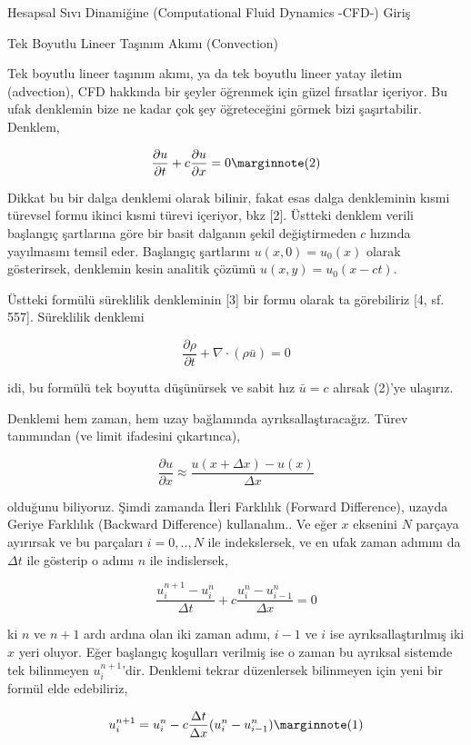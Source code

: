 \documentclass[12pt,fleqn]{article}\usepackage{../../common}
\begin{document}
Hesapsal Sıvı Dinamiğine (Computational Fluid Dynamics -CFD-) Giriş 

Tek Boyutlu Lineer Taşınım Akımı (Convection)

Tek boyutlu lineer taşınım akımı, ya da tek boyutlu lineer yatay iletim
(advection), CFD hakkında bir şeyler öğrenmek için güzel fırsatlar içeriyor. Bu
ufak denklemin bize ne kadar çok şey öğreteceğini görmek bizi
şaşırtabilir. Denklem,

$$
\frac{\partial u}{\partial t} +
c \frac{\partial u}{\partial x}  = 0
\mlabel{2}
$$

Dikkat bu bir dalga denklemi olarak bilinir, fakat esas dalga denkleminin kısmi
türevsel formu ikinci kısmi türevi içeriyor, bkz [2]. Üstteki denklem verili
başlangıç şartlarına göre bir basit dalganın şekil değiştirmeden $c$ hızında
yayılmasını temsil eder. Başlangıç şartlarını $u(x,0) = u_0(x)$ olarak
gösterirsek, denklemin kesin analitik çözümü $u(x,y) = u_0(x-ct)$.

Üstteki formülü süreklilik denkleminin [3] bir formu olarak ta görebiliriz [4, sf. 557].
Süreklilik denklemi

$$
\frac{\partial \rho}{\partial t}  + \nabla \cdot (\rho \bar{u} ) = 0
$$

idi, bu formülü tek boyutta düşünürsek ve sabit hız $\bar{u} = c$ alırsak (2)'ye ulaşırız.


Denklemi hem zaman, hem uzay bağlamında ayrıksallaştıracağız. Türev tanımından
(ve limit ifadesini çıkartınca),

$$
\frac{\partial u}{\partial x} \approx
\frac{u(x+\Delta x) - u(x)}{\Delta x}
$$

olduğunu biliyoruz. Şimdi zamanda İleri Farklılık (Forward Difference), uzayda
Geriye Farklılık (Backward Difference) kullanalım.. Ve eğer $x$ eksenini $N$
parçaya ayırırsak ve bu parçaları $i=0,..,N$ ile indekslersek, ve en ufak zaman
adımını da $\Delta t$ ile gösterip o adımı $n$ ile indislersek,

$$
\frac{u_i^{n+1} - u_i^n}{\Delta t} + c \frac{u_i^{n} - u_{i-1}^n}{\Delta x} = 0
$$

ki $n$ ve $n+1$ ardı ardına olan iki zaman adımı, $i-1$ ve $i$ ise
ayrıksallaştırılmış iki $x$ yeri oluyor. Eğer başlangıç koşulları verilmiş ise o
zaman bu ayrıksal sistemde tek bilinmeyen $u_i^{n+1}$'dir. Denklemi tekrar
düzenlersek bilinmeyen için yeni bir formül elde edebiliriz,

$$
u_i^{n+1} = u_i^n - c \frac{\Delta t}{\Delta x} ( u_i^n - u_{i-1}^n )
\mlabel{1}
$$
\end{document}
